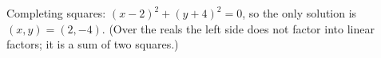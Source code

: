 Completing squares: $(x-2)^2+(y+4)^2=0$, so the only solution is $\boxed{(x,y)=(2,-4)}$. (Over the reals the left side does not factor into linear factors; it is a sum of two squares.)
